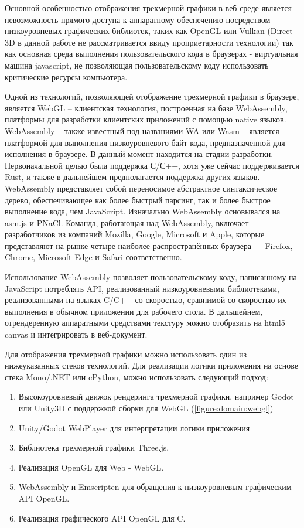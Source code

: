 Основной особенностью отображения трехмерной графики в веб среде является невозможность прямого доступа к аппаратному обеспечению
посредством низкоуровневых графических библиотек, таких как OpenGL или Vulkan (Direct 3D в данной работе не рассматривается ввиду
проприетарности технологии) так как основная среда выполнения пользовательского кода в браузерах - виртуальная машина javascript,
не позволяющая пользовательскому коду использовать критические ресурсы компьютера.

Одной из технологий, позволяющей отображение трехмерной графики в браузере, является WebGL -- клиентская технология, построенная на базе
WebAssembly, платформы для разработки клиентских приложений с помощью native языков. WebAssembly -- также известный под названиями WA
или Wasm -- является платформой для выполнения низкоуровневого байт-кода, предназначенной для исполнения в браузере. В данный момент находится
на стадии разработки. Первоначальной целью была поддержка С/С++, хотя уже сейчас поддерживается Rust, и также в дальнейшем предполагается
поддержка других языков. WebAssemblу представляет собой переносимое абстрактное синтаксическое дерево, обеспечивающее как более быстрый парсинг,
так и более быстрое выполнение кода, чем JavaScript. Изначально WebAssembly основывался на asm.js и PNaCl. Команда, работающая над WebAssembly,
включает разработчиков из компаний Mozilla, Google, Microsoft и Apple, которые представляют на рынке четыре наиболее распространённых браузера — Firefox,
Chrome, Microsoft Edge и Safari соответственно.

Использование WebAssembly позволяет пользовательскому коду, написанному на JavaScript потреблять API, реализованный низкоуровневыми библиотеками, реализованными
на языках C/C++ со скоростью, сравнимой со скоростью их выполнения в обычном приложении для рабочего стола. В дальшейнем, отрендеренную аппаратными средствами
текстуру можно отобразить на html5 canvas и интегрировать в веб-документ.

Для отображения трехмерной графики можно использовать один из нижеуказанных стеков технологий.
Для реализации логики приложения на основе стека Mono/.NET или cPython, можно использовать следующий подход:
\begin{enumerate}[label=\arabic*.]
\item Высокоуровневый движок рендеринга трехмерной графики, например Godot или Unity3D с поддержкой сборки для WebGL (\ref{figure:domain:webgl})
\item Unity/Godot WebPlayer для интерпретации логики приложения 
\item Библиотека трехмерной графики Three.js.
\item Реализация OpenGL для Web - WebGL.
\item WebAssembly и Emscripten для обращения к низкоуровневым графическим API OpenGL.
\item Реализация графического API OpenGL для C.
\end{enumerate}

